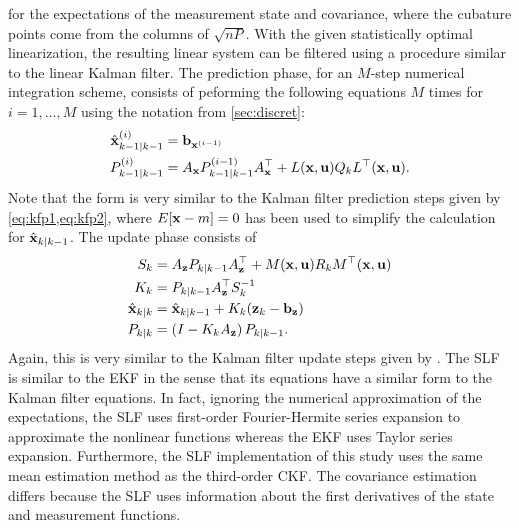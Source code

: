 \documentclass[../zhang_thesis.tex]{subfiles}
\begin{document}
for the expectations of the measurement state and covariance, where the cubature points come from the columns of $\sqrt{nP}$. With the given statistically optimal linearization, the resulting linear system can be filtered using a procedure similar to the linear Kalman filter. The prediction phase, for an $M$-step numerical integration scheme, consists of peforming the following equations $M$ times for $i=1,\dots,M$ using the notation from \cref{sec:discret}:
\begin{align}
    \hat{\mathbf{x}}_{k-1|k-1}^{(i)} &= \mathbf{b}_{\mathbf{x}^{(i-1)}} \\
    P_{k-1|k-1}^{(i)} &= A_{\mathbf{x}} P_{k-1|k-1}^{(i-1)} A_{\mathbf{x}}^\top + L(\mathbf{x},\mathbf{u}) Q_k L^\top(\mathbf{x},\mathbf{u}).
\end{align}
Note that the form is very similar to the Kalman filter prediction steps given by \cref{eq:kfp1,eq:kfp2}, where $E[\mathbf{x}-m]=0$ has been used to simplify the calculation for $\hat{\mathbf{x}}_{k|k-1}$. The update phase consists of
\begin{align}
    S_k &= A_{\mathbf{z}} P_{k|k-1} A_{\mathbf{z}}^\top + M(\mathbf{x},\mathbf{u}) R_k M^\top(\mathbf{x},\mathbf{u}) \\
    K_k &= P_{k|k-1} A_{\mathbf{z}}^\top S_k^{-1} \\
    \hat{\mathbf{x}}_{k|k} &= \hat{\mathbf{x}}_{k|k-1} + K_k (\mathbf{z}_k - \mathbf{b}_{\mathbf{z}}) \\
    P_{k|k} &= \left( I - K_k A_{\mathbf{z}} \right) P_{k|k-1}. \label{eq:slfl}
\end{align}
Again, this is very similar to the Kalman filter update steps given by . The SLF is similar to the EKF in the sense that its equations have a similar form to the Kalman filter equations. In fact, ignoring the numerical approximation of the expectations, the SLF uses first-order Fourier-Hermite series expansion to approximate the nonlinear functions whereas the EKF uses Taylor series expansion. Furthermore, the SLF implementation of this study uses the same
mean estimation method as the third-order CKF. The covariance estimation differs because the SLF uses information about the first derivatives of the state and measurement functions.
\end{document}
